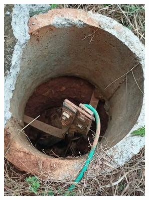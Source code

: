 \begin{figure}[H]
     \centering
     \begin{subfigure}[b]{0.2\textwidth}
         \centering
         \includegraphics[width=\textwidth]{images/1.JPG}
     \end{subfigure}
     \hfill
     \begin{subfigure}[b]{0.25\textwidth}
         \centering

\end{subfigure}
\end{figure}

